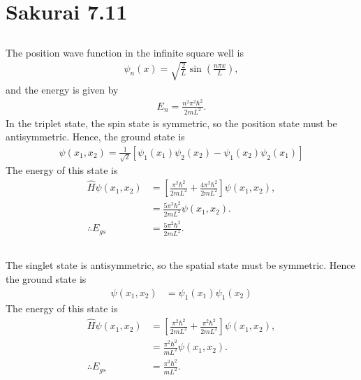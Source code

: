 \documentclass[
a4paper,
10pt,
twoside,
]{article}
\begin{document}
\section{Sakurai 7.11}\label{sec: III}


\subsection{}\label{ssec: IIIA}
The position wave function in the infinite square well is
\begin{align}
	\psi_n(x) = \sqrt{\frac{2}{L}}\sin(\frac{n\pi x}{L}),
\end{align}
and the energy is given by
\begin{align}
	E_n = \frac{n^2 \pi^2 \hbar^2}{2mL^2}.
\end{align}
In the triplet state, the spin state is symmetric, so the position state must be antisymmetric.
Hence, the ground state is
\begin{align}
	\psi(x_1,x_2) = \frac{1}{\sqrt{2}} \left[\psi_1(x_1)\psi_2(x_2)-\psi_1(x_2)\psi_2(x_1)\right]
\end{align}
The energy of this state is
\begin{align}
	\hat{H}\psi(x_1,x_2) &= \left[\frac{\pi^2\hbar^2}{2mL^2} + \frac{4\pi^2\hbar^2}{2mL^2}\right]\psi(x_1,x_2),\\
	&= \frac{5\pi^2\hbar^2}{2mL^2}\psi(x_1,x_2).\\
	\therefore E_{gs} &= \frac{5\pi^2\hbar^2}{2mL^2}.
\end{align}


\subsection{}\label{ssec: IIIB}


The singlet state is antisymmetric, so the spatial state must be symmetric.
Hence the ground state is
\begin{align}
	\psi(x_1,x_2) &= \psi_1(x_1)\psi_1(x_2)
\end{align}
The energy of this state is
\begin{align}
	\hat{H}\psi(x_1,x_2) &= \left[\frac{\pi^2\hbar^2}{2mL^2} + \frac{\pi^2\hbar^2}{2mL^2}\right]\psi(x_1,x_2),\\
	&= \frac{\pi^2\hbar^2}{mL^2}\psi(x_1,x_2).\\
	\therefore E_{gs} &= \frac{\pi^2\hbar^2}{mL^2}.
\end{align}


\subsection{}\label{ssec: IIIC}
\end{document}
